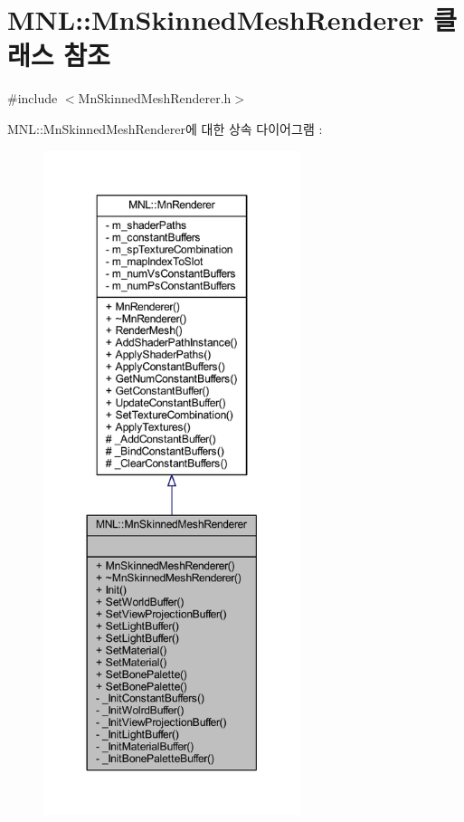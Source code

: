 \hypertarget{class_m_n_l_1_1_mn_skinned_mesh_renderer}{}\section{M\+NL\+:\+:Mn\+Skinned\+Mesh\+Renderer 클래스 참조}
\label{class_m_n_l_1_1_mn_skinned_mesh_renderer}


{\ttfamily \#include $<$Mn\+Skinned\+Mesh\+Renderer.\+h$>$}



M\+NL\+:\+:Mn\+Skinned\+Mesh\+Renderer에 대한 상속 다이어그램 \+: \nopagebreak
\begin{figure}[H]
\begin{center}
\leavevmode
\includegraphics[height=550pt]{class_m_n_l_1_1_mn_skinned_mesh_renderer__inherit__graph}
\end{center}
\end{figure}


